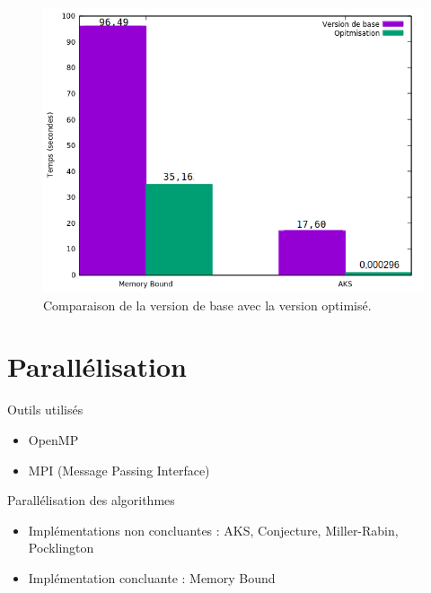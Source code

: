 		\begin{frame}
	\begin{figure}[!ht]	
		\begin{center}\includegraphics[scale=0.4]{Optimisation.png}\end{center}
		\caption{Comparaison de la version de base avec la version optimisé.}
		\label{fg:fig2}
	\end{figure}	
	\end{frame}
	
	\section{Parallélisation}
	\begin{frame}
	\begin{block}{Outils utilisés}
	\begin{itemize}
		\item OpenMP
		\item MPI (Message Passing Interface)
	\end{itemize}
	\end{block}
	\pause
	\vspace{2.5em}
	\begin{block}{Parallélisation des algorithmes}
	\begin{itemize}
		\item Implémentations non concluantes : AKS, Conjecture, Miller-Rabin, Pocklington 
		\item Implémentation concluante : Memory Bound
	\end{itemize}
	\end{block}
	\end{frame}
	
